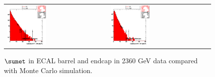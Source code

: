\begin{figure}[h!]
 \centering
 \begin{tabular}{ll}
  \includegraphics[width=0.40\textwidth]{plots_DataVsMC_MB_2360GeV/h_caloSumetEB.eps} &
  \includegraphics[width=0.40\textwidth]{plots_DataVsMC_MB_2360GeV/h_caloSumetEE.eps} \\
 \end{tabular}
 \caption{$\sumet$ in ECAL barrel and endcap in 2360 GeV data compared
   with Monte Carlo simulation.
          \label{fig:DataVsMC_MB_2360_4}}
\end{figure}

